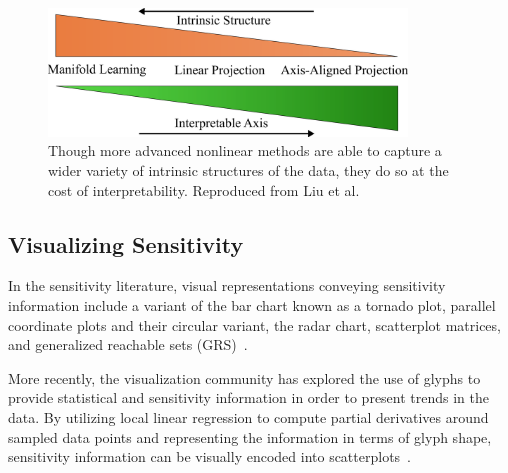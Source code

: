 \begin{figure}[!ht]
  \centering
  \includegraphics[width=0.85\textwidth]{figs/chap3/interpretableAxis}
  \caption[Interpretability of Dimensionality Reduction Techniques]{Though more advanced nonlinear methods are able to capture a wider variety of intrinsic structures of the data, they do so at the cost of interpretability. Reproduced from Liu et al.~\cite{LiuMaljovecWang2015}}
  \label{fig:axisInterpretability}
\end{figure}

\subsection{Visualizing Sensitivity}
\label{sec:SA_visualization}
In the sensitivity literature, visual representations conveying sensitivity information include a variant of the bar chart known as a tornado plot, parallel coordinate plots and their circular variant, the radar chart, scatterplot matrices,  and generalized reachable sets (GRS)~\cite{SaltelliChanScott2000,BushenkovChernykhKamenev1995}.

More recently, the visualization community has explored the use of glyphs to provide statistical and sensitivity information in order to present trends in the data.
%
By utilizing local linear regression to compute partial derivatives around sampled data points and representing the information in terms of glyph shape, sensitivity information can be visually encoded into scatterplots~\cite{CorreaChanMa2009,ChanCorreaMa2010,GuoWardRundensteiner2011,ChanCorreaMa2013}.

